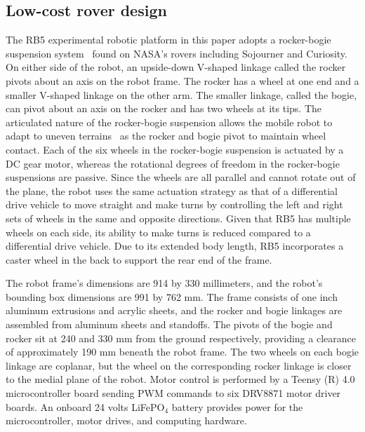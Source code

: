 \documentclass[lettersize,journal,twoside]{IEEEtran}
\theoremstyle{definition}
\begin{document}
\subsection{Low-cost %
rover design}
\label{sec:md}
\noindent
The RB5 experimental robotic platform in this paper adopts a rocker-bogie suspension system~\cite{bickler1989articulated} found on NASA's rovers including Sojourner and Curiosity. On either side of the robot, an upside-down V-shaped linkage called the rocker pivots about an axis on the robot frame. The rocker has a wheel at one end and a smaller V-shaped linkage on the other arm. The smaller linkage, called the bogie, can pivot about an axis on the rocker and has two wheels at its tips. The articulated nature of the rocker-bogie suspension allows the mobile robot to adapt to uneven terrains~\cite{%
faisal2021low} as the rocker and bogie pivot to maintain wheel contact. %
%
Each of the six wheels in the rocker-bogie suspension is actuated by a DC gear motor, whereas the rotational degrees of freedom in the rocker-bogie suspensions are passive. Since the wheels are all parallel and cannot rotate out of the plane, the robot uses the same actuation strategy as that of a differential drive vehicle to move straight and make turns by controlling the left and right sets of wheels in the same and opposite directions. Given that RB5 has multiple wheels on each side, its ability to make turns is reduced compared to a differential drive vehicle. Due to its extended body length, RB5 incorporates a caster wheel in the back to support the rear end of the frame.

The robot frame's dimensions are 914 by 330 millimeters, and the robot's bounding box dimensions are 991 by 762 mm. The frame consists of one inch aluminum extrusions and acrylic sheets, and the rocker and bogie linkages are assembled from aluminum sheets and standoffs. The pivots of the bogie and rocker sit at 240 and 330 mm from the ground respectively, providing a clearance of approximately 190 mm beneath the robot frame. The two wheels on each bogie linkage are coplanar, but the wheel on the corresponding rocker linkage is closer to the medial plane of the robot. Motor control is performed by a Teensy (R) 4.0 microcontroller board sending PWM commands to six DRV8871 motor driver boards. An onboard 24 volts LiFePO${}_\text{4}$ battery provides power for the microcontroller, motor drives, and computing hardware.
\end{document}
